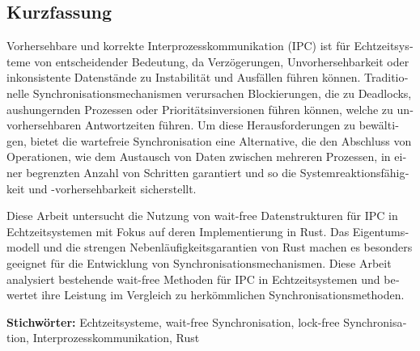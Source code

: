 \cleardoublepage

\begin{otherlanguage}{ngerman}
\chapter*{Kurzfassung}


Vorhersehbare und korrekte Interprozesskommunikation (IPC) ist für Echtzeitsysteme von entscheidender Bedeutung, da Verzögerungen, Unvorhersehbarkeit oder inkonsistente Datenstände zu Instabilität und Ausfällen führen können. Traditionelle Synchronisationsmechanismen verursachen Blockierungen, die zu Deadlocks, aushungernden Prozessen oder Prioritätsinversionen führen können, welche zu unvorhersehbaren Antwortzeiten führen. Um diese Herausforderungen zu bewältigen, bietet die wartefreie Synchronisation eine Alternative, die den Abschluss von Operationen, wie dem Austausch von Daten zwischen mehreren Prozessen, in einer begrenzten Anzahl von Schritten garantiert und so die Systemreaktionsfähigkeit und -vorhersehbarkeit sicherstellt.

Diese Arbeit untersucht die Nutzung von wait-free Datenstrukturen für IPC in Echtzeitsystemen mit Fokus auf deren Implementierung in Rust. Das Eigentumsmodell und die strengen Nebenläufigkeitsgarantien von Rust machen es besonders geeignet für die Entwicklung von Synchronisationsmechanismen. Diese Arbeit analysiert bestehende wait-free Methoden für IPC in Echtzeitsystemen und bewertet ihre Leistung im Vergleich zu herkömmlichen Synchronisationsmethoden.

\vfill
\noindent\textbf{Stichwörter:} Echtzeitsysteme, wait-free Synchronisation, lock-free Synchronisation, Interprozesskommunikation, Rust
\vfill
\end{otherlanguage}
